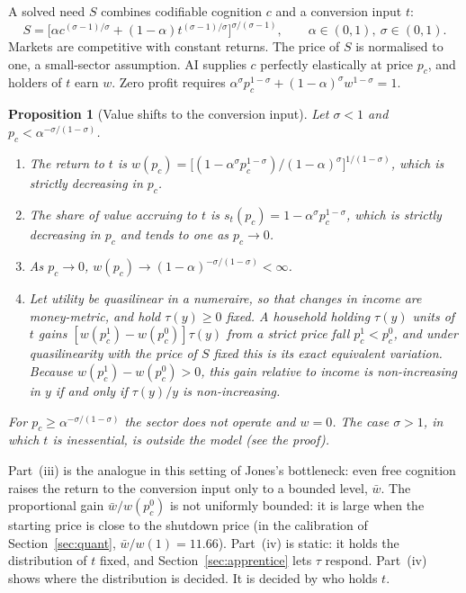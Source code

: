 \documentclass[12pt]{article}
\newtheorem{proposition}{Proposition}
\theoremstyle{remark}
\begin{document}
A solved need $S$ combines codifiable cognition $c$ and a conversion input $t$:
\begin{equation}
S=\big[\alpha c^{(\sigma-1)/\sigma}+(1-\alpha)t^{(\sigma-1)/\sigma}\big]^{\sigma/(\sigma-1)},\qquad \alpha\in(0,1),\ \sigma\in(0,1).
\end{equation}
Markets are competitive with constant returns. The price of $S$ is normalised to one, a small-sector assumption. AI supplies $c$ perfectly elastically at price $p_c$, and holders of $t$ earn $w$. Zero profit requires $\alpha^\sigma p_c^{1-\sigma}+(1-\alpha)^\sigma w^{1-\sigma}=1$.

\begin{proposition}[Value shifts to the conversion input]\label{prop:valueshift}
Let $\sigma<1$ and $p_c<\alpha^{-\sigma/(1-\sigma)}$.
\begin{enumerate}[label=(\roman*),itemsep=0pt]
\item The return to $t$ is $w(p_c)=\big[(1-\alpha^\sigma p_c^{1-\sigma})/(1-\alpha)^\sigma\big]^{1/(1-\sigma)}$, which is strictly decreasing in $p_c$.
\item The share of value accruing to $t$ is $s_t(p_c)=1-\alpha^\sigma p_c^{1-\sigma}$, which is strictly decreasing in $p_c$ and tends to one as $p_c\to0$.
\item As $p_c\to0$, $w(p_c)\to(1-\alpha)^{-\sigma/(1-\sigma)}<\infty$.
\item Let utility be quasilinear in a numeraire, so that changes in income are money-metric, and hold $\tau(y)\ge0$ fixed. A household holding $\tau(y)$ units of $t$ gains $[w(p_c^1)-w(p_c^0)]\tau(y)$ from a strict price fall $p_c^1<p_c^0$, and under quasilinearity with the price of $S$ fixed this is its exact equivalent variation. Because $w(p_c^1)-w(p_c^0)>0$, this gain relative to income is non-increasing in $y$ if and only if $\tau(y)/y$ is non-increasing.
\end{enumerate}
For $p_c\ge\alpha^{-\sigma/(1-\sigma)}$ the sector does not operate and $w=0$. The case $\sigma>1$, in which $t$ is inessential, is outside the model (see the proof).
\end{proposition}

Part~(iii) is the analogue in this setting of Jones's bottleneck: even free cognition raises the return to the conversion input only to a bounded level, $\bar w$. The proportional gain $\bar w/w(p_c^0)$ is not uniformly bounded: it is large when the starting price is close to the shutdown price (in the calibration of Section~\ref{sec:quant}, $\bar w/w(1)=11.66$). Part~(iv) is static: it holds the distribution of $t$ fixed, and Section~\ref{sec:apprentice} lets $\tau$ respond. Part~(iv) shows where the distribution is decided. It is decided by who holds $t$.
\end{document}
